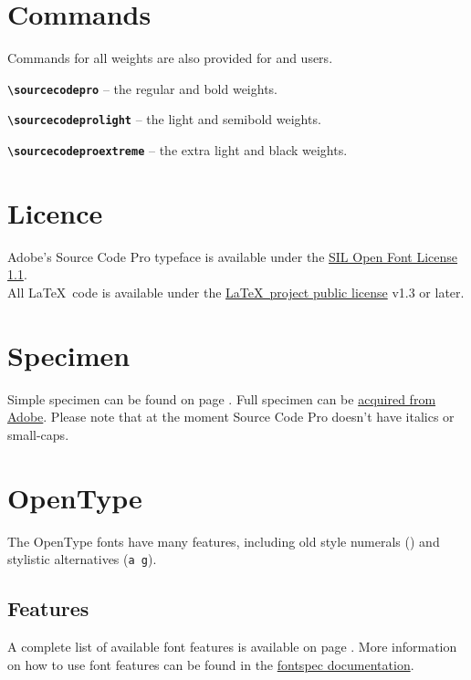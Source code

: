 \documentclass[10pt,a4paper,english]{article}
\begin{document}
\begin{multicols}{2}
\section{Commands}
Commands for all weights are also provided for  and  users.
\begin{itemize*}
	\item \texttt{\bfseries \textbackslash sourcecodepro}
		-- the regular and bold weights.
	\item \texttt{\bfseries \textbackslash sourcecodeprolight}
		-- the light and semibold weights.
	\item \texttt{\bfseries \textbackslash sourcecodeproextreme}
		-- the extra light and black weights.
\end{itemize*}

\section{Licence}
Adobe's Source Code Pro typeface is available under the \href{http://scripts.sil.org/OFL}{SIL Open Font License 1.1}.\\
All \LaTeX\ code is available under the \href{http://www.latex-project.org/lppl/}{\LaTeX\ project public license} v1.3 or later.

\section{Specimen}
Simple specimen can be found on page \pageref{sec:specimen}. Full specimen can be \href{http://store1.adobe.com/type/browser/pdfs/1960.pdf}{acquired from Adobe}. Please note that at the moment Source Code Pro doesn’t have italics or small-caps.

\section{OpenType}
The OpenType fonts have many features, including old style numerals (\texttt{})
and stylistic alternatives (\texttt{{a g}}).

\subsection{Features}
A complete list of available font features is available on page \pageref{sec:otfinfo}. More information on how to use font features can be found in the \href{http://mirror.ctan.org/macros/latex/contrib/fontspec/fontspec.pdf}{fontspec documentation}.


\end{multicols}
\end{document}
